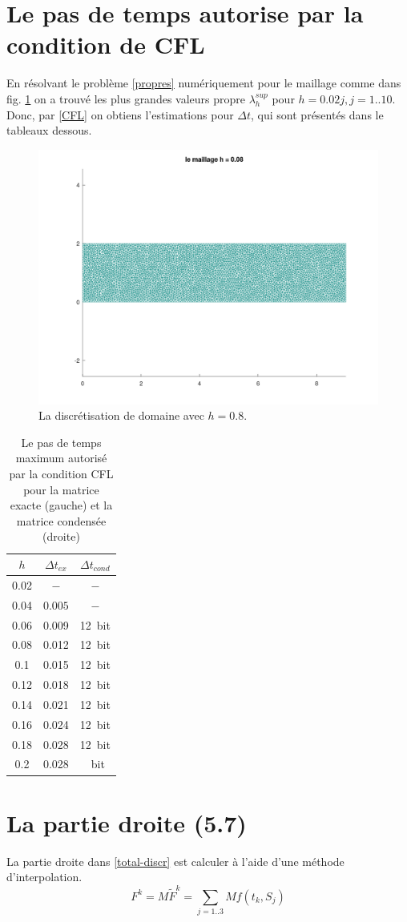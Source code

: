 \documentclass[12pt]{article}
\begin{document}
\section{Le pas de temps autorise par la condition de CFL}
En résolvant le problème \eqref{propres} numériquement pour le maillage comme dans fig. \ref{fig:maillage1} on a trouvé les plus grandes valeurs propre $\lambda^{sup}_h$ pour $h = 0.02j, j = 1..10$. Donc, par \eqref{CFL} on obtiens l'estimations pour $\Delta t$, qui sont présentés dans le tableaux dessous.
	\begin{figure}
	\centering
	\includegraphics[height=0.4\linewidth]{images/maillage1}
	\caption{La discrétisation de domaine  avec $h = 0.8$.}
	\label{fig:maillage1}
\end{figure}
\begin{table}[H]
	\caption{\label{tab:canonsummary} Le pas de temps maximum autorisé par la condition CFL pour la matrice exacte (gauche) et la matrice condensée (droite) }
	\begin{center}
		\begin{tabular}{|c|c|c|}
			\hline
			$h$ & $\Delta t_{ex}$ & $\Delta t_{cond}$ \\
			\hline
			0.02 & $-$ &  $-$ \\
			0.04 &  $ 0.005$ &  $-$ \\
			0.06 & 0.009 & 12~bit\\
			0.08 & 0.012 &12~bit\\
			0.1  & 0.015 &12~bit\\
			0.12 & 0.018 &12~bit\\
			0.14 & 0.021 &12~bit\\
			0.16 & 0.024 &12~bit\\
			0.18 & 0.028 &12~bit\\
			0.2  & 0.028 &~bit\\
			\hline
		\end{tabular}
	\end{center}
\end{table} 
\section{La partie droite (5.7)}
La partie droite dans \eqref{total-discr} est calculer à l'aide d'une méthode d'interpolation.
\begin{equation}
	F^k = M\tilde{F}^k =\sum_{j = 1..3} Mf(t_k, S_j)
\end{equation}
\end{document}
